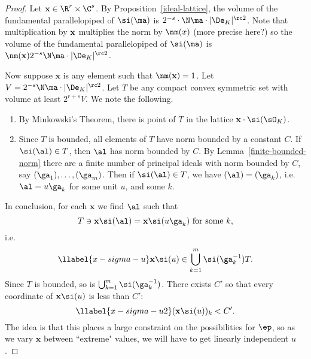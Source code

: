 \begin{proof}
Let $\textbf x\in \R^r\times \C^s$. By Proposition~\ref{ideal-lattice}, the volume of the fundamental parallelopiped of $\si(\ma)$ is $2^{-s} \cdot \N\ma \cdot |\De_K|^{\rc2}$. Note that multiplication by $\textbf x$ %
multiplies the norm by $\nm(x)$ (more precise here?)
so the volume of the fundamental parallelopiped of $\si(\ma)$ is %
$\nm(\mathbf x)2^{-s}\N\ma\cdot |\De_K|^{\rc 2}$.

Now suppose $\mathbf x$ is any element such that $\nm(\mathbf x)=1$. Let $V=2^{-s}\N\ma\cdot |\De_K|^{\rc 2}$. 
Let $T$ be any compact convex symmetric set with volume at least $2^{r+s}V$. 
We note the following.
\begin{enumerate}
\item By Minkowski's Theorem, there is point of $T$ in the lattice $\mathbf x\cdot \si(\sO_K)$. 
\item
Since $T$ is bounded, all elements of $T$ have norm bounded by a constant $C$. If $\si(\al)\in T$, then $\al$ has norm bounded by $C$. By Lemma~\ref{finite-bounded-norm} there are a finite number of principal ideals with norm bounded by $C$, say $(\ga_1),\ldots, (\ga_m)$. Then if $\si(\al)\in T$, we have $(\al)=(\ga_k)$, i.e. $\al=u\ga_k$ for some unit $u$, and some $k$.
\end{enumerate}
In conclusion, for each $\mathbf x$ we find $\al$ such that
\[
T\ni \mathbf x \si(\al)=\mathbf x\si(u\ga_k)\text{ for some $k$},
\] 
i.e.
\begin{equation}\llabel{x-sigma-u}
\mathbf x \si(u)\in \bigcup_{k=1}^m \si(\ga_k^{-1}) T.
\end{equation}
Since $T$ is bounded, so is $\bigcup_{k=1}^m \si(\ga_k^{-1})$. There exists $C'$ so that every coordinate of $\mathbf{x}\si(u)$ is less than $C'$:
\begin{equation}\llabel{x-sigma-u2}
(\mathbf{x}\si(u))_k<C'.
\end{equation}
The idea is that this places a large constraint on the possibilities for $\ep$, so as we vary $\mathbf x$ between ``extreme" values, we will have to get linearly independent $u$.


\end{proof}
